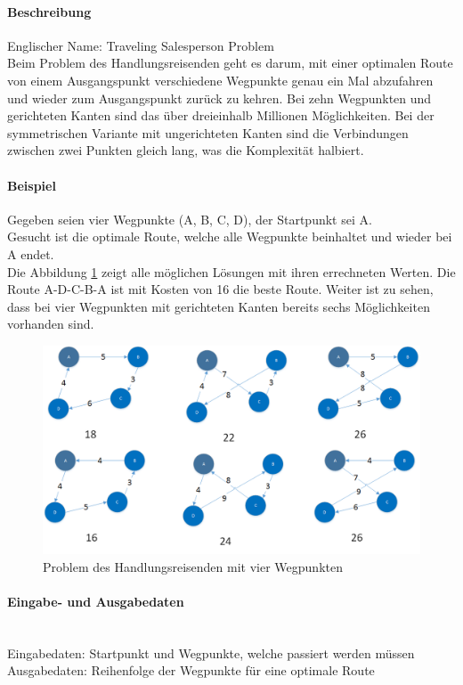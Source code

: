 	\paragraph{Beschreibung}
	Englischer Name: Traveling Salesperson Problem\\
	Beim Problem des Handlungsreisenden geht es darum, mit einer optimalen Route von einem Ausgangspunkt verschiedene Wegpunkte genau ein Mal abzufahren und wieder zum 
	Ausgangspunkt zurück zu kehren. Bei zehn Wegpunkten und gerichteten Kanten sind das über dreieinhalb Millionen Möglichkeiten. Bei der symmetrischen Variante mit ungerichteten Kanten 
	sind die Verbindungen zwischen zwei Punkten gleich lang, was die Komplexität halbiert. 

	\paragraph{Beispiel} Gegeben seien vier Wegpunkte (A, B, C, D), der Startpunkt sei A.\\
	Gesucht ist die optimale Route, welche alle Wegpunkte beinhaltet und wieder bei A endet.\\
	Die Abbildung \ref{fig:tsp_example} zeigt alle möglichen Lösungen mit ihren errechneten Werten. Die Route A-D-C-B-A ist mit Kosten von 16 die beste Route. Weiter ist zu sehen, 
	dass bei vier Wegpunkten mit gerichteten Kanten bereits sechs Möglichkeiten vorhanden sind.
\begin{figure}[h]
\centering
\includegraphics[scale=0.55]{images/visio/tsp.png}
\caption[Problem des Handlungsreisenden mit 4 Wegpunkten]{Problem des Handlungsreisenden mit vier Wegpunkten \selfmade{}}
\label{fig:tsp_example}
\end{figure}

	\paragraph{Eingabe- und Ausgabedaten}\mbox{}\\
	Eingabedaten: Startpunkt und Wegpunkte, welche passiert werden müssen\\
	Ausgabedaten: Reihenfolge der Wegpunkte für eine optimale Route

